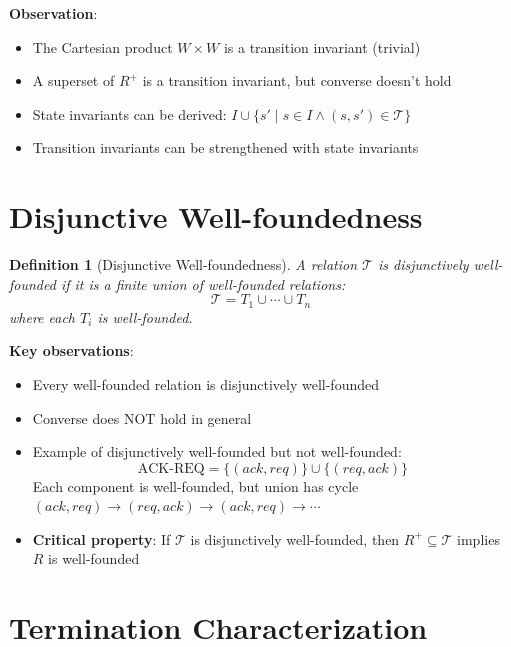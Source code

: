 \documentclass{article}
\newtheorem{definition}{Definition}
\begin{document}
\textbf{Observation}:
\begin{itemize}
    \item The Cartesian product $W \times W$ is a transition invariant (trivial)
    \item A superset of $R^+$ is a transition invariant, but converse doesn't hold
    \item State invariants can be derived: $I \cup \{s' \mid s \in I \land (s, s') \in \mathcal{T}\}$
    \item Transition invariants can be strengthened with state invariants
\end{itemize}

\section{Disjunctive Well-foundedness}

\begin{definition}[Disjunctive Well-foundedness]
A relation $\mathcal{T}$ is \emph{disjunctively well-founded} if it is a finite union of well-founded relations:
\begin{equation}
\mathcal{T} = T_1 \cup \cdots \cup T_n
\end{equation}
where each $T_i$ is well-founded.
\end{definition}

\textbf{Key observations}:
\begin{itemize}
    \item Every well-founded relation is disjunctively well-founded
    \item Converse does NOT hold in general

    \item Example of disjunctively well-founded but not well-founded:
    \begin{equation}
    \text{ACK-REQ} = \{(ack, req)\} \cup \{(req, ack)\}
    \end{equation}
    Each component is well-founded, but union has cycle $(ack, req) \to (req, ack) \to (ack, req) \to \cdots$

    \item \textbf{Critical property}: If $\mathcal{T}$ is disjunctively well-founded, then $R^+ \subseteq \mathcal{T}$ implies $R$ is well-founded
\end{itemize}

\section{Termination Characterization}
\end{document}
